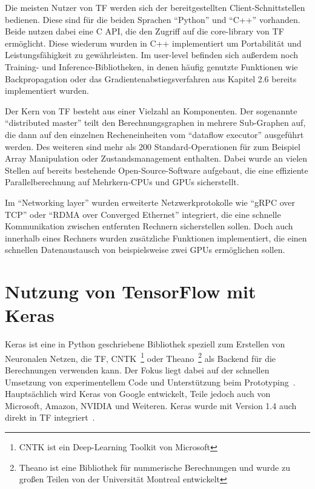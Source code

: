 Die meisten Nutzer von \gls{TF} werden sich der bereitgestellten Client-Schnittstellen bedienen. Diese sind für die beiden Sprachen "`Python"' und "`C++"' vorhanden. Beide nutzen dabei eine C API, die den Zugriff auf die core-library von \gls{TF} ermöglicht. Diese wiederum wurden in C++ implementiert um Portabilität und Leistungsfähigkeit zu gewährleisten. Im user-level befinden sich außerdem noch Training- und Inference-Bibliotheken, in denen häufig genutzte Funktionen wie Backpropagation oder das Gradientenabstiegsverfahren aus
Kapitel 2.6 bereits implementiert wurden.

Der Kern von \gls{TF} besteht aus einer Vielzahl an Komponenten. Der sogenannte "`distributed master"' teilt den Berechnungsgraphen in mehrere Sub-Graphen auf, die dann auf den einzelnen Recheneinheiten vom "`dataflow executor"' ausgeführt werden. Des weiteren sind mehr als 200 Standard-Operationen für zum Beispiel Array Manipulation oder Zustandsmanagement enthalten. Dabei wurde an vielen Stellen auf bereits bestehende Open-Source-Software aufgebaut, die eine effiziente Parallelberechnung auf Mehrkern-CPUs und GPUs sicherstellt.

Im "`Networking layer"' wurden erweiterte Netzwerkprotokolle wie "`gRPC over TCP"' oder "`RDMA over Converged Ethernet"' integriert, die eine schnelle Kommunikation zwischen entfernten Rechnern sicherstellen sollen. Doch auch innerhalb eines Rechners wurden zusätzliche Funktionen implementiert, die einen schnellen Datenaustausch von beispielsweise zwei GPUs ermöglichen sollen.

\section{Nutzung von TensorFlow mit Keras}

Keras ist eine in Python geschriebene Bibliothek speziell zum Erstellen von Neuronalen Netzen, die \gls{TF}, CNTK~\footnote{CNTK ist ein Deep-Learning Toolkit von Microsoft} oder Theano~\footnote{Theano ist eine Bibliothek für nummerische Berechnungen und wurde zu großen Teilen von der Universität Montreal entwickelt} als Backend für die Berechnungen verwenden kann. Der Fokus liegt dabei auf der schnellen Umsetzung von experimentellem Code und Unterstützung beim Prototyping~\cite{keras}. Hauptsächlich wird Keras von Google entwickelt, Teile jedoch auch von Microsoft, Amazon, NVIDIA und Weiteren. Keras wurde mit Version 1.4 auch direkt in \gls{TF} integriert~\cite{tfRelease}.

